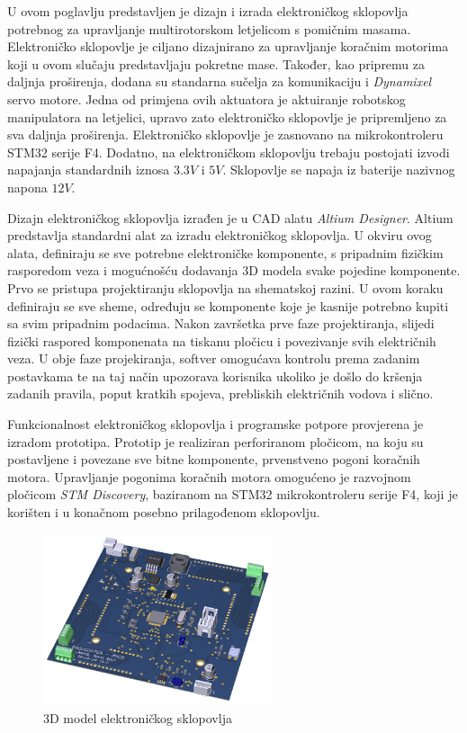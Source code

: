 \documentclass[11pt,a4paper]{article}
\begin{document}
U ovom poglavlju predstavljen je dizajn i izrada elektroničkog sklopovlja potrebnog za upravljanje multirotorskom letjelicom s pomičnim masama. Elektroničko sklopovlje je ciljano dizajnirano za upravljanje koračnim motorima koji u ovom slučaju predstavljaju pokretne mase. Također, kao pripremu za daljnja proširenja, dodana su standarna sučelja za komunikaciju i \textit{Dynamixel} servo motore. Jedna od primjena ovih aktuatora je aktuiranje robotskog manipulatora na letjelici, upravo zato elektroničko sklopovlje je pripremljeno za sva daljnja proširenja. Elektroničko sklopovlje je zasnovano na mikrokontroleru STM32 serije F4. Dodatno, na elektroničkom sklopovlju trebaju postojati izvodi napajanja standardnih iznosa $3.3 V$ i $5 V$. Sklopovlje se napaja iz baterije nazivnog napona $12 V$. 

\medskip

Dizajn elektroničkog sklopovlja izrađen je u CAD alatu \textit{Altium Designer}. Altium predstavlja standardni alat za izradu elektroničkog sklopovlja. U okviru ovog alata, definiraju se sve potrebne elektroničke komponente, s pripadnim fizičkim rasporedom veza i mogućnošću dodavanja 3D modela svake pojedine komponente. Prvo se pristupa projektiranju sklopovlja na shematskoj razini. U ovom koraku definiraju se sve sheme, određuju se komponente koje je kasnije potrebno kupiti sa svim pripadnim podacima. Nakon završetka prve faze projektiranja, slijedi fizički raspored komponenata na tiskanu pločicu i povezivanje svih električnih veza. U obje faze projekiranja, softver omogućava kontrolu prema zadanim postavkama te na taj način upozorava korisnika ukoliko je došlo do kršenja zadanih pravila, poput kratkih spojeva, prebliskih električnih vodova i slično.

\medskip

Funkcionalnost elektroničkog sklopovlja i programske potpore provjerena je izradom prototipa. Prototip je realiziran perforiranom pločicom, na koju su postavljene i povezane sve bitne komponente, prvenstveno pogoni koračnih motora. Upravljanje pogonima koračnih motora omogućeno je razvojnom pločicom \textit{STM Discovery}, baziranom na STM32 mikrokontroleru serije F4, koji je korišten i u konačnom posebno prilagođenom sklopovlju.



\begin{figure}[H]
	\centering
	\includegraphics[width=0.6\textwidth]{figures/arducopter_pcb.png}
	\caption{3D model elektroničkog sklopovlja}
	\label{Slika:3D_PCB}
\end{figure}
\end{document}
